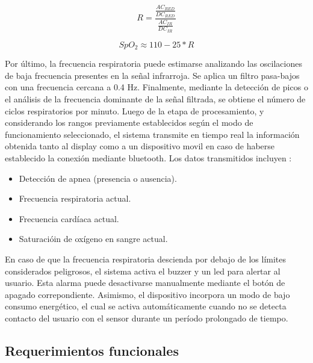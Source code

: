 \begin{equation}
    R = \frac{\frac{AC_{RED}}{DC_{RED}}}{\frac{AC_{IR}}{DC_{IR}}}
\end{equation}

\begin{equation}
    SpO_{2} \approx 110 -25*R
\end{equation}

Por último, la frecuencia respiratoria puede estimarse analizando las oscilaciones de baja frecuencia presentes en la señal infrarroja.
Se aplica un filtro pasa-bajos con una frecuencia cercana a 0.4 Hz.
Finalmente, mediante la detección de picos o el análisis de la frecuencia dominante de la señal filtrada, se obtiene el número de ciclos respiratorios por minuto. 
Luego de la etapa de procesamiento, y considerando los rangos previamente establecidos según el modo de funcionamiento seleccionado, el sistema transmite en tiempo real la información obtenida tanto al display como a un dispositivo movil en caso de haberse establecido la conexión mediante bluetooth.
Los datos transmitidos incluyen : 

\begin{itemize}
    \item Detección de apnea (presencia o ausencia). 
    \item Frecuencia respiratoria actual. 
    \item Frecuencia cardíaca actual. 
    \item Saturacióin de oxígeno en sangre actual.
\end{itemize}

En caso de que la frecuencia respiratoria descienda por debajo de los límites considerados peligrosos, el sistema activa el buzzer y un led para alertar al usuario.
Esta alarma puede desactivarse manualmente mediante el botón de apagado correpondiente.
Asimismo, el dispositivo incorpora un modo de bajo consumo energético, el cual se activa automáticamente cuando no se detecta contacto del usuario con el sensor durante un período prolongado de tiempo.

\subsection{Requerimientos funcionales}

